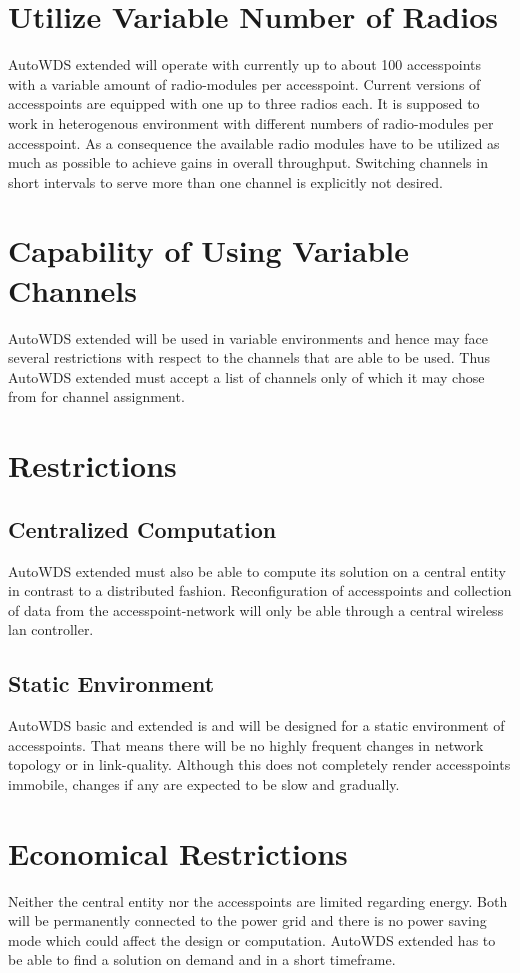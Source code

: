 \section{Utilize Variable Number of Radios}
  AutoWDS extended will operate with currently up to about 100 accesspoints with a variable amount of radio-modules per accesspoint.
  Current versions of accesspoints are equipped with one up to three radios each. It is supposed to work in heterogenous environment with 
  different numbers of radio-modules per accesspoint. As a consequence the available radio modules 
  have to be utilized as much as possible to achieve gains in overall throughput.
  Switching channels in short intervals to serve more than one channel is explicitly not desired.
  \section{Capability of Using Variable Channels}
  AutoWDS extended will be used in variable environments and hence may face several restrictions with respect to the channels that are able to be used.
  Thus AutoWDS extended must accept a list of channels only of which it may chose from for channel assignment.
  \section{Restrictions}
  \subsection{Centralized Computation}
    AutoWDS extended must also be able to compute its solution on a central entity in contrast to a distributed fashion.
    Reconfiguration of accesspoints and collection of data from the accesspoint-network will only be able through a central wireless lan controller.
  \subsection{Static Environment}
    AutoWDS basic and extended is and will be designed for a static environment of accesspoints. That means there will be no highly frequent changes in
    network topology or in link-quality. Although this does not completely render accesspoints immobile, changes if any are expected to be slow and gradually.
\section{Economical Restrictions}
  Neither the central entity nor the accesspoints are limited regarding energy. Both will be permanently connected to the power grid and there is no power saving mode
  which could affect the design or computation.
  AutoWDS extended has to be able to find a solution on demand and in a short timeframe.